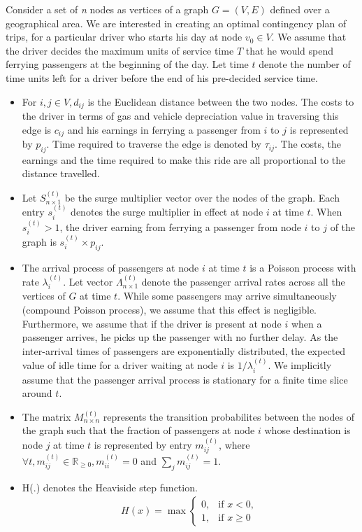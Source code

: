 Consider a set of \emph{n} nodes as vertices of a graph $G=(V,E)$ defined over a geographical area. We are interested in creating an optimal contingency plan of trips, for a particular driver who starts his day at node $v_0 \in V$. We assume that the driver decides the maximum units of service time $T$ that he would spend ferrying passengers at the beginning of the day. Let time $t$ denote the number of time units left for a driver before the end of his pre-decided service time.
\begin{itemize}
\item For $i,j \in V, d_{ij}$ is the Euclidean distance between the two nodes. The costs to the driver in terms of gas and vehicle depreciation value in traversing this edge is $c_{ij}$ and his earnings in ferrying a passenger from $i$ to $j$ is represented by $p_{ij}$. Time required to traverse the edge is denoted by $\tau_{ij}$. The costs, the earnings and the time required to make this ride are all proportional to the distance travelled.

\item Let $S^{(t)}_{n \times 1}$ be the surge multiplier vector over the nodes of the graph. Each entry $s_i^{(t)}$ denotes the surge multiplier in effect at node $i$ at time $t$. When $s_i^{(t)} > 1$, the driver earning from ferrying a passenger from node $i$ to $j$ of the graph is $s_i^{(t)} \times p_{ij}$.

\item The arrival process of passengers at node $i$ at time $t$ is a Poisson process with rate $\lambda_i^{(t)}$. Let vector $\Lambda^{(t)}_{n \times 1}$ denote the passenger arrival rates across all the vertices of $G$ at time $t$. While some passengers may arrive simultaneously (compound Poisson process), we assume that this effect is negligible. Furthermore, we assume that if the driver is present at node $i$ when a passenger arrives, he picks up the passenger with no further delay. As the inter-arrival times of passengers are exponentially distributed, the expected value of idle time for a driver waiting at node $i$ is $1/\lambda_i^{(t)}$. We implicitly assume that the passenger arrival process is stationary for a finite time slice around $t$.

\item The matrix $M^{(t)}_{n \times n}$ represents the transition probabilites between the nodes of the graph such that the fraction of passengers at node $i$ whose destination is node $j$ at time $t$ is represented by entry $m_{ij}^{(t)}$, where $\forall t, m_{ij}^{(t)} \in \mathbb{R}_{\geq 0}, m_{ii}^{(t)}=0$ and $\sum\limits_{j}m_{ij}^{(t)}=1$.

\item H(.) denotes the Heaviside step function. \\
\begin{eqnarray*}
H(x) = \max
    \begin{cases}
    0, & \text{if } x < 0, \\
    1, & \text{if } x \geq 0
    \end{cases}
\end{eqnarray*}
\end{itemize}

